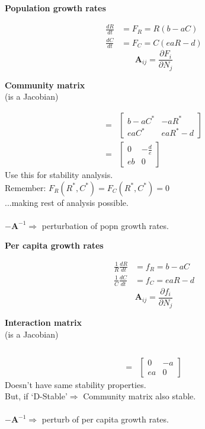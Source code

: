 \documentclass{article}
\begin{document}
\begin{minipage}[t]{0.5\textwidth}
\begin{center}\textbf{Population growth rates}\end{center}
\begin{align*}
	\frac{dR}{dt}&=F_R = R(b-aC)\\
	\frac{dC}{dt}&=F_C=C(eaR-d)
\end{align*}
\begin{equation*}\mathbf{A}_{ij}=\frac{\partial F_i}{\partial N_j}\end{equation*}
\begin{center}\textbf{Community matrix}\\(is a Jacobian)\end{center}
\begin{align*}
	=&\begin{bmatrix}
	b-aC^* & -aR^*\\eaC^* & eaR^* - d
	\end{bmatrix}\\
	=&\begin{bmatrix}
		0 & -\frac{d}{e}\\eb & 0
		\end{bmatrix}
\end{align*}
Use this for stability analysis.\\
Remember: $F_R(R^*,C^*)=F_C(R^*,C^*)=0$\\
...making rest of analysis possible.\\
\\
$-\mathbf{A}^{-1} \Rightarrow$ perturbation of popn growth rates.
\end{minipage}
\begin{minipage}[t]{0.5\textwidth}
\begin{center}\textbf{Per capita growth rates}\end{center}
\begin{align*}
	\frac{1}{R}\frac{dR}{dt}&=f_R = b-aC\\
	\frac{1}{C}\frac{dC}{dt}&=f_C=eaR-d
\end{align*}
\begin{equation*}\mathbf{A}_{ij}=\frac{\partial f_i}{\partial N_j}\end{equation*}
\begin{center}\textbf{Interaction matrix}\\(is a Jacobian)\end{center}
\begin{align*}
\\
\\
	=&\begin{bmatrix}
		0 & -a\\ea & 0
		\end{bmatrix}
\end{align*}
Doesn't have same stability properties.\\
But, if `D-Stable'$\Rightarrow$ Community matrix also stable.\\
\\
$-\mathbf{A}^{-1} \Rightarrow$  perturb of per capita growth rates.
\end{minipage}
\end{document}
